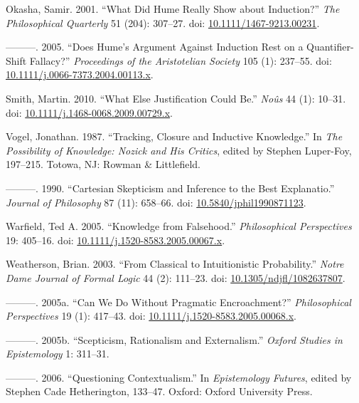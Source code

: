 \documentclass[
  10pt,
  letterpaper,
  DIV=11,
  numbers=noendperiod,
  twoside]{scrartcl}
\newlength{\cslhangindent}
\newenvironment{CSLReferences}[2] %
 {\begin{list}{}{%
  \setlength{\itemindent}{0pt}
  \setlength{\leftmargin}{0pt}
  \setlength{\parsep}{0pt}
  \ifodd #1
   \setlength{\leftmargin}{\cslhangindent}
   \setlength{\itemindent}{-1\cslhangindent}
  \fi
  \setlength{\itemsep}{#2\baselineskip}}}
 {\end{list}}
\begin{document}
\begin{CSLReferences}{1}{0}
Okasha, Samir. 2001. {``What Did Hume Really Show about Induction?''}
\emph{The Philosophical Quarterly} 51 (204): 307--27. doi:
\href{https://doi.org/10.1111/1467-9213.00231}{10.1111/1467-9213.00231}.

---------. 2005. {``Does Hume's Argument Against Induction Rest on a
Quantifier-Shift Fallacy?''} \emph{Proceedings of the Aristotelian
Society} 105 (1): 237--55. doi:
\href{https://doi.org/10.1111/j.0066-7373.2004.00113.x}{10.1111/j.0066-7373.2004.00113.x}.

Smith, Martin. 2010. {``What Else Justification Could Be.''}
\emph{No{û}s} 44 (1): 10--31. doi:
\href{https://doi.org/10.1111/j.1468-0068.2009.00729.x}{10.1111/j.1468-0068.2009.00729.x}.

Vogel, Jonathan. 1987. {``Tracking, Closure and Inductive Knowledge.''}
In \emph{The Possibility of Knowledge: Nozick and His Critics}, edited
by Stephen Luper-Foy, 197--215. Totowa, NJ: Rowman \& Littlefield.

---------. 1990. {``Cartesian Skepticism and Inference to the Best
Explanatio.''} \emph{Journal of Philosophy} 87 (11): 658--66. doi:
\href{https://doi.org/10.5840/jphil1990871123}{10.5840/jphil1990871123}.

Warfield, Ted A. 2005. {``Knowledge from Falsehood.''}
\emph{Philosophical Perspectives} 19: 405--16. doi:
\href{https://doi.org/10.1111/j.1520-8583.2005.00067.x}{10.1111/j.1520-8583.2005.00067.x}.

Weatherson, Brian. 2003. {``From Classical to Intuitionistic
Probability.''} \emph{Notre Dame Journal of Formal Logic} 44 (2):
111--23. doi:
\href{https://doi.org/10.1305/ndjfl/1082637807}{10.1305/ndjfl/1082637807}.

---------. 2005a. {``{Can We Do Without Pragmatic Encroachment?}''}
\emph{Philosophical Perspectives} 19 (1): 417--43. doi:
\href{https://doi.org/10.1111/j.1520-8583.2005.00068.x}{10.1111/j.1520-8583.2005.00068.x}.

---------. 2005b. {``Scepticism, Rationalism and Externalism.''}
\emph{Oxford Studies in Epistemology} 1: 311--31.

---------. 2006. {``Questioning Contextualism.''} In \emph{Epistemology
Futures}, edited by Stephen Cade Hetherington, 133--47. Oxford: Oxford
University Press.


\end{CSLReferences}
\end{document}
